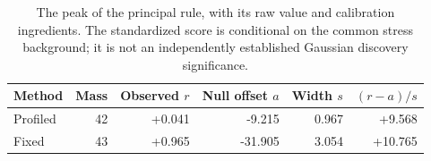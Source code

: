 \begin{table}[H]\centering\small
\begin{tabular}{lrrrrr}\toprule
Method & Mass & Observed $r$ & Null offset $a$ & Width $s$ & $(r-a)/s$\\\midrule
Profiled & 42 & +0.041 & -9.215 & 0.967 & +9.568 \\
Fixed & 43 & +0.965 & -31.905 & 3.054 & +10.765 \\
\bottomrule\end{tabular}
\caption{The peak of the principal rule, with its raw value and calibration ingredients. The standardized score is conditional on the common stress background; it is not an independently established Gaussian discovery significance.}\end{table}

